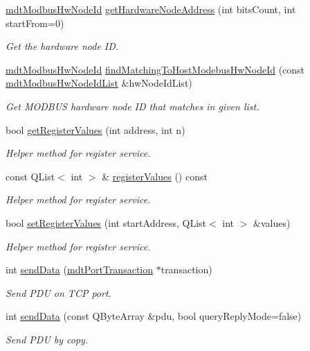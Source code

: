 \begin{DoxyCompactItemize}
\hyperlink{classmdt_modbus_hw_node_id}{mdt\-Modbus\-Hw\-Node\-Id} \hyperlink{classmdt_modbus_tcp_port_manager_a02f498667f432c4430d1983e3dfd6055}{get\-Hardware\-Node\-Address} (int bits\-Count, int start\-From=0)
\begin{DoxyCompactList}\small\item\em Get the hardware node I\-D. \end{DoxyCompactList}\item 
\hyperlink{classmdt_modbus_hw_node_id}{mdt\-Modbus\-Hw\-Node\-Id} \hyperlink{classmdt_modbus_tcp_port_manager_aefc317fd2714a81fabb6fef84251f73c}{find\-Matching\-To\-Host\-Modebus\-Hw\-Node\-Id} (const \hyperlink{classmdt_modbus_hw_node_id_list}{mdt\-Modbus\-Hw\-Node\-Id\-List} \&hw\-Node\-Id\-List)
\begin{DoxyCompactList}\small\item\em Get M\-O\-D\-B\-U\-S hardware node I\-D that matches in given list. \end{DoxyCompactList}\item 
bool \hyperlink{classmdt_modbus_tcp_port_manager_ab5e780409492b5f56326a870bc4262ec}{get\-Register\-Values} (int address, int n)
\begin{DoxyCompactList}\small\item\em Helper method for register service. \end{DoxyCompactList}\item 
const Q\-List$<$ int $>$ \& \hyperlink{classmdt_modbus_tcp_port_manager_a99a13b5250a8523aa63869991581e56a}{register\-Values} () const 
\begin{DoxyCompactList}\small\item\em Helper method for register service. \end{DoxyCompactList}\item 
bool \hyperlink{classmdt_modbus_tcp_port_manager_a746211413dfafb987a93145c9fa4876f}{set\-Register\-Values} (int start\-Address, Q\-List$<$ int $>$ \&values)
\begin{DoxyCompactList}\small\item\em Helper method for register service. \end{DoxyCompactList}\item 
int \hyperlink{classmdt_modbus_tcp_port_manager_a208a3b2522795974836fd8aef406725a}{send\-Data} (\hyperlink{classmdt_port_transaction}{mdt\-Port\-Transaction} $\ast$transaction)
\begin{DoxyCompactList}\small\item\em Send P\-D\-U on T\-C\-P port. \end{DoxyCompactList}\item 
int \hyperlink{classmdt_modbus_tcp_port_manager_ac6ffcccbba23b1bda5cba2ae347793ba}{send\-Data} (const Q\-Byte\-Array \&pdu, bool query\-Reply\-Mode=false)
\begin{DoxyCompactList}\small\item\em Send P\-D\-U by copy. \end{DoxyCompactList}\end{DoxyCompactItemize}
